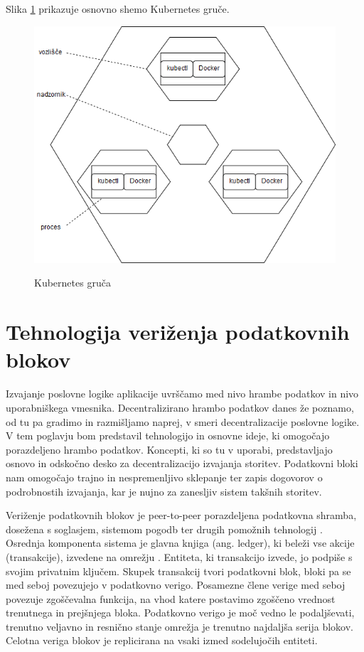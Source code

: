 \documentclass[a4paper, 12pt]{book}
\begin{document}
Slika \ref{kubernetes_cluster} prikazuje osnovno shemo Kubernetes gruče.

\begin{figure}[h]
	\includegraphics[width=1.0\textwidth]{slike/kubernetes_cluster.png}
	\label{kubernetes_cluster}
	\caption{Kubernetes gruča \cite{kubernetesTutorial}}
\end{figure}


\chapter{Tehnologija veriženja podatkovnih blokov}
\label{ch2}

Izvajanje poslovne logike aplikacije uvrščamo med nivo hrambe podatkov in nivo uporabniškega vmesnika.
Decentralizirano hrambo podatkov danes že poznamo, od tu pa gradimo in razmišljamo naprej, v smeri decentralizacije poslovne logike.
V tem poglavju bom predstavil tehnologijo in osnovne ideje, ki omogočajo porazdeljeno hrambo podatkov.
Koncepti, ki so tu v uporabi, predstavljajo osnovo in odskočno desko za decentralizacijo izvajanja storitev.
Podatkovni bloki nam omogočajo trajno in nespremenljivo sklepanje ter zapis dogovorov o podrobnostih izvajanja, kar je nujno za zanesljiv sistem takšnih storitev.

Veriženje podatkovnih blokov je peer-to-peer porazdeljena podatkovna shramba, dosežena s soglasjem, sistemom  pogodb ter drugih pomožnih tehnologij \cite{hyperledgerWeb}. Osrednja komponenta sistema je glavna knjiga (ang. ledger), ki beleži vse akcije (transakcije), izvedene na omrežju \cite{hyperledgerDocs}.
Entiteta, ki transakcijo izvede, jo podpiše s svojim privatnim ključem.
Skupek transakcij tvori podatkovni blok, bloki pa se med seboj povezujejo v podatkovno verigo.
Posamezne člene verige med seboj povezuje zgoščevalna funkcija, na vhod katere postavimo zgoščeno vrednost trenutnega in prejšnjega bloka.
Podatkovno verigo je moč vedno le podaljševati, trenutno veljavno in resnično stanje omrežja je trenutno najdaljša serija blokov.
Celotna veriga blokov je replicirana na vsaki izmed sodelujočih entiteti.
\end{document}
